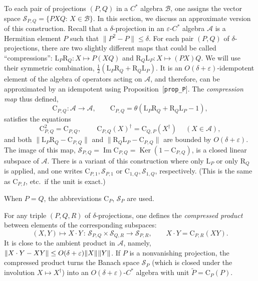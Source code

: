 \hypertarget{def:compressed-corner}{}%
\begin{definition}\label{def:compressed-corner}
To each pair of projections $(P,Q)$ in a $C^*$ algebra $\mathcal{B}$, one assigns the vector space $\mathcal{S}_{P,Q}=\{PXQ:\,X\in\mathcal{B}\}$. In this section, we discuss an approximate version of this construction. Recall that a $\delta$-projection in an $\varepsilon$-$C^*$ algebra $\mathcal{A}$ is a Hermitian element $P$ such that $\|P^2-P\|\le\delta$. For each pair $(P,Q)$ of $\delta$-projections, there are two slightly different maps that could be called ``compressions'': $\mathrm{L}_P\mathrm{R}_Q\colon X\mapsto P(XQ)$ and $\mathrm{R}_Q\mathrm{L}_P\colon X\mapsto (PX)Q$. We will use their symmetric combination, $\frac{1}{2}(\mathrm{L}_P\mathrm{R}_Q+\mathrm{R}_Q\mathrm{L}_P)$. It is an $O(\delta+\varepsilon)$-idempotent element of the algebra of operators acting on $\mathcal{A}$, and therefore, can be approximated by an idempotent using Proposition~\textup{[\texttt{prop\_P}]}. The \emph{compression map} thus defined,
\begin{equation*}
\mathrm{C}_{P,Q}\colon\mathcal{A}\to\mathcal{A},\qquad
\mathrm{C}_{P,Q}=\theta(\mathrm{L}_P\mathrm{R}_Q+\mathrm{R}_Q\mathrm{L}_P-1),
\end{equation*}
satisfies the equations
\begin{equation*}
\mathrm{C}_{P,Q}^2=\mathrm{C}_{P,Q},\qquad\:
\mathrm{C}_{P,Q}(X)^\dagger=\mathrm{C}_{Q,P}(X^\dagger)\quad\: (X\in\mathcal{A}),
\end{equation*}
and both $\|\mathrm{L}_P\mathrm{R}_Q-\mathrm{C}_{P,Q}\|$ and $\|\mathrm{R}_Q\mathrm{L}_P-\mathrm{C}_{P,Q}\|$ are bounded by $O(\delta+\varepsilon)$. The image of this map, $\mathcal{S}_{P,Q}=\operatorname{Im}\mathrm{C}_{P,Q}=\operatorname{Ker}(1-\mathrm{C}_{P,Q})$, is a closed linear subspace of $\mathcal{A}$. There is a variant of this construction where only $\mathrm{L}_P$ or only $\mathrm{R}_Q$ is applied, and one writes $\mathrm{C}_{P,1},\mathcal{S}_{P,1}$ or $\mathrm{C}_{1,Q},\mathcal{S}_{1,Q}$, respectively. (This is the same as $\mathrm{C}_{P,I}$, etc.\ if the unit is exact.)

When $P=Q$, the abbreviations $\mathrm{C}_{P}$, $\mathcal{S}_P$ are used.

For any triple $(P,Q,R)$ of $\delta$-projections, one defines the \emph{compressed product} between elements of the corresponding subspaces:
\begin{equation*}
(X,Y)\mapsto X\cdot Y\,\colon\,
\mathcal{S}_{P,Q}\times\mathcal{S}_{Q,R}\to \mathcal{S}_{P,R},\qquad X\cdot Y=\mathrm{C}_{P,R}(XY).
\end{equation*}
It is close to the ambient product in $\mathcal{A}$, namely, $\|X\cdot Y-XY\|\le O(\delta+\varepsilon)\|X\|\mkern1mu\|Y\|$. If $P$ is a nonvanishing projection, the compressed product turns the Banach space $\mathcal{S}_P$ (which is closed under the involution $X\mapsto X^\dagger$) into an $O(\delta+\varepsilon)$-$C^*$ algebra with unit $\widetilde{P}=\mathrm{C}_{P}(P)$.\medskip
\end{definition}
